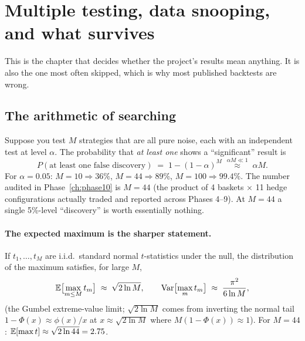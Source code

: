 \section{Multiple testing, data snooping, and what survives}
\label{ch:multipletesting}

This is the chapter that decides whether the project's results mean anything. It is also
the one most often skipped, which is why most published backtests are wrong.

\subsection{The arithmetic of searching}
\label{sec:mt:arithmetic}

Suppose you test $M$ strategies that are all pure noise, each with an independent test at
level $\alpha$. The probability that \emph{at least one} shows a ``significant'' result is
\begin{equation}
  P(\text{at least one false discovery}) \;=\; 1-(1-\alpha)^{M}
  \;\overset{\alpha M\ll1}{\approx}\; \alpha M .
  \label{eq:familywise}
\end{equation}
For $\alpha=0.05$: $M=10\Rightarrow36\%$, $M=44\Rightarrow89\%$, $M=100\Rightarrow99.4\%$.
The number audited in Phase~\ref{ch:phase10} is $M=44$ (the product of 4 baskets
$\times$ 11 hedge configurations actually traded and reported across Phases 4--9). At
$M=44$ a single 5\%-level ``discovery'' is worth essentially nothing.

\paragraph{The expected maximum is the sharper statement.} If $t_1,\dots,t_M$ are i.i.d.\
standard normal $t$-statistics under the null, the distribution of the maximum satisfies,
for large $M$,
\begin{equation}
  \mathbb{E}\bigl[\max_{m\le M} t_m\bigr] \;\approx\; \sqrt{2\ln M},
  \qquad
  \operatorname{Var}\bigl[\max_m t_m\bigr] \;\approx\; \frac{\pi^2}{6\ln M},
  \label{eq:maxnormal}
\end{equation}
(the Gumbel extreme-value limit; $\sqrt{2\ln M}$ comes from inverting the normal tail
$1-\Phi(x)\approx\phi(x)/x$ at $x\approx\sqrt{2\ln M}$ where $M(1-\Phi(x))\approx1$).
For $M=44$: $\mathbb{E}[\max t]\approx\sqrt{2\ln 44}=2.75$.


